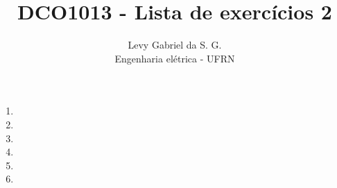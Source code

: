 \title{DCO1013 - Lista de exercícios 2}
\author{Levy Gabriel da S. G. \\ Engenharia elétrica - UFRN}

\maketitle
\thispagestyle{fancy}

\begin{enumerate}
    \item 
    \item 
    \item 
    \item 
    \item 
    \item 
\end{enumerate}